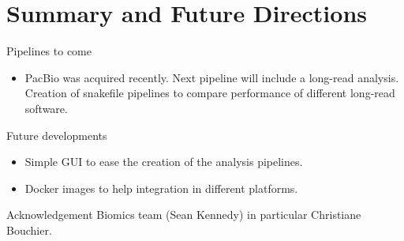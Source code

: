 \documentclass{beamer}
\begin{document}
\section{Summary and Future Directions}
\begin{frame}

\begin{block}{Pipelines to come}
\begin{itemize}
 \item PacBio was acquired recently. Next pipeline will include
 a long-read analysis. Creation of snakefile pipelines to compare performance 
 of different long-read software.
\end{itemize}
\end{block}

\begin{block}{Future developments}
 \begin{itemize}
  \item Simple GUI to ease the creation of the analysis pipelines.
  \item Docker images to help integration in different platforms.
 \end{itemize}
\end{block}
 \end{frame}

\begin{frame}{Acknowledgement}
    Biomics team (Sean Kennedy) in particular Christiane Bouchier.
\end{frame}
\end{document}
